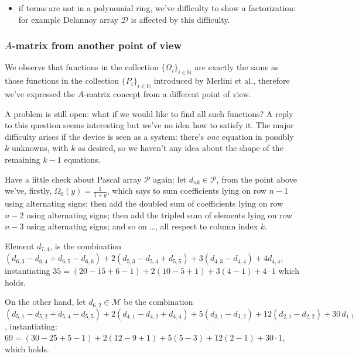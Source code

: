 \begin{itemize}
        \item if terms are not in a polynomial ring, we've difficulty to show a
        factorization: for example Delannoy array $\mathcal{D}$ is affected by this difficulty.

    \end{itemize}

\subsubsection{$A$-matrix from another point of view}

We observe that functions in the collection
$\lbrace\Omega_{i}\rbrace_{i\in\mathbb{N}}$ are exactly the same as those
functions in the collection $\lbrace P_{i}\rbrace_{i\in\mathbb{N}}$ introduced
by Merlini et al., therefore we've expressed the $A$-matrix concept from a
different point of view. 

A problem is still open: what if we would like to find all such functions? A reply
to this question seems interesting but we've no idea how to satisfy it.
The major difficulty arises if the device is seen as a system:
there's \emph{one} equation in possibly $k$ unknowns, with $k$ as desired, 
so we haven't any idea about the shape of the remaining $k-1$ equations.

Have a little check about Pascal array $\mathcal{P}$ again:
let $d_{nk}\in\mathcal{P}$, from the point above we've, firstly,
$\Omega_{0}(y)=\frac{1}{1+y}$, which says to sum coefficients
lying on row $n-1$ using alternating signs; then add the doubled sum of
coefficients lying on row $n-2$ using alternating signs; 
then add the tripled sum of elements lying on row $n-3$ 
using alternating signs; and so on \ldots, all respect to column index $k$. 

Element $d_{7,4}$,  is the combination 
    $(d_{6,3}-d_{6,4}+d_{6,5}-d_{6,6})+
    2(d_{5,3}-d_{5,4}+d_{5,5}) + 3(d_{4,3}-d_{4,4}) + 4d_{4,4}$, 
    instantiating $35 = (20-15+6-1)+2(10-5+1)+3(4-1)+4\cdot1$
     which holds.

On the other hand, let $d_{6,2}\in\mathcal{M}$ be the
combination $(d_{5,1}-d_{5,2}+d_{5,4}-d_{5,5})
    +2(d_{4,1}-d_{4,2}+d_{4,4})
    +5(d_{3,1}-d_{3,2})
    +12(d_{2,1} -d_{2,2})
    +30\,d_{1,1}$, instantiating: 
    $69=(30-25+5-1)
    +2(12-9+1)
    +5(5-3)
    +12(2 -1)
    +30\cdot1$, which holds.

